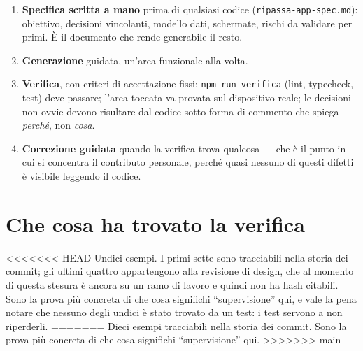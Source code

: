 \documentclass[11pt,a4paper]{report}
\begin{document}
\begin{enumerate}[nosep]
  \item \textbf{Specifica scritta a mano} prima di qualsiasi codice
        (\texttt{ripassa-app-spec.md}): obiettivo, decisioni vincolanti,
        modello dati, schermate, rischi da validare per primi. \`E il documento
        che rende generabile il resto.
  \item \textbf{Generazione} guidata, un'area funzionale alla volta.
  \item \textbf{Verifica}, con criteri di accettazione fissi: \texttt{npm run
        verifica} (lint, typecheck, test) deve passare; l'area toccata va
        provata sul dispositivo reale; le decisioni non ovvie devono risultare
        dal codice sotto forma di commento che spiega \emph{perch\'e}, non
        \emph{cosa}.
  \item \textbf{Correzione guidata} quando la verifica trova qualcosa --- che
        \`e il punto in cui si concentra il contributo personale, perch\'e
        quasi nessuno di questi difetti \`e visibile leggendo il codice.
\end{enumerate}

\section{Che cosa ha trovato la verifica}

<<<<<<< HEAD
Undici esempi. I primi sette sono tracciabili nella storia dei commit; gli
ultimi quattro appartengono alla revisione di design, che al momento di questa
stesura \`e ancora su un ramo di lavoro e quindi non ha hash citabili. Sono la
prova pi\`u concreta di che cosa significhi ``supervisione'' qui, e vale la
pena notare che nessuno degli undici \`e stato trovato da un test: i test
servono a non riperderli.
=======
Dieci esempi tracciabili nella storia dei commit. Sono la prova pi\`u concreta
di che cosa significhi ``supervisione'' qui.
>>>>>>> main
\end{document}
